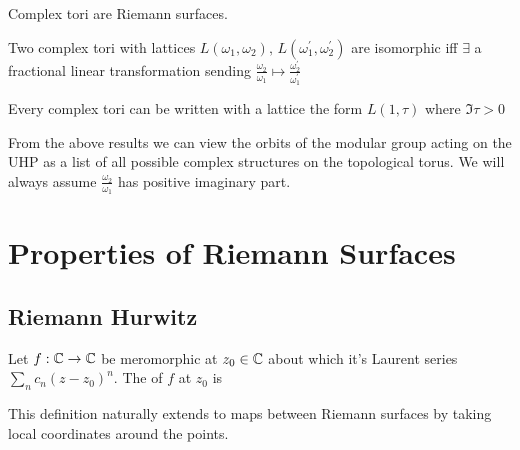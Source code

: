 \documentclass{article}
\begin{document}
\begin{prop}
	Complex tori are Riemann surfaces. 
\end{prop}

\begin{prop}
	Two complex tori with lattices $L(\omega_1, \omega_2), \, L(\omega_1^\prime, \omega_2^\prime)$ are isomorphic iff $\exists$ a fractional linear transformation sending $\frac{\omega_2}{\omega_1} \mapsto \frac{\omega_2^\prime}{\omega_1^\prime}$
\end{prop}

\begin{prop}
	Every complex tori can be written with a lattice the form $L(1,\tau)$ where $\Im\tau > 0$
\end{prop}

\begin{remark}
	From the above results we can view the orbits of the modular group acting on the UHP as a list of all possible complex structures on the topological torus. We will always assume $\frac{\omega_2}{\omega_1}$ has positive imaginary part.  
\end{remark}

\section{Properties of Riemann Surfaces}
\subsection{Riemann Hurwitz}

\begin{definition}
	Let $f:\mathbb{C} \to \mathbb{C}$ be meromorphic at $z_0 \in \mathbb{C}$ about which it's Laurent series $\sum_n c_n (z-z_0)^n$. The  of $f$ at $z_0$ is 
\end{definition}

\begin{remark}
	This definition naturally extends to maps between Riemann surfaces by taking local coordinates around the points. 
\end{remark}
\end{document}
